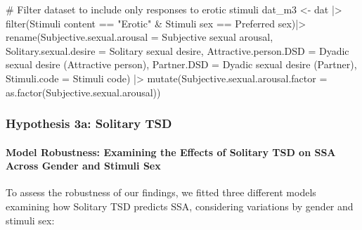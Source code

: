 \documentclass[
  bookmarksnumbered]{article}
\newenvironment{Shaded}{\begin{snugshade}}{\end{snugshade}}
\newcommand{\AttributeTok}[1]{\textcolor[rgb]{0.80,0.80,0.80}{#1}}
\newcommand{\CommentTok}[1]{\textcolor[rgb]{0.50,0.62,0.50}{#1}}
\newcommand{\FunctionTok}[1]{\textcolor[rgb]{0.94,0.94,0.56}{#1}}
\newcommand{\NormalTok}[1]{\textcolor[rgb]{0.80,0.80,0.80}{#1}}
\newcommand{\OtherTok}[1]{\textcolor[rgb]{0.94,0.94,0.56}{#1}}
\newcommand{\SpecialCharTok}[1]{\textcolor[rgb]{0.86,0.64,0.64}{#1}}
\newcommand{\StringTok}[1]{\textcolor[rgb]{0.80,0.58,0.58}{#1}}
\begin{document}
\begin{Shaded}
\begin{Highlighting}[]
\CommentTok{\# Filter dataset to include only responses to erotic stimuli}
\NormalTok{dat\_m3 }\OtherTok{\textless{}{-}}\NormalTok{ dat }\SpecialCharTok{|\textgreater{}}
  \FunctionTok{filter}\NormalTok{(}\StringTok{\textasciigrave{}}\AttributeTok{Stimuli content}\StringTok{\textasciigrave{}} \SpecialCharTok{==} \StringTok{"Erotic"} \SpecialCharTok{\&}
           \StringTok{\textasciigrave{}}\AttributeTok{Stimuli sex}\StringTok{\textasciigrave{}} \SpecialCharTok{==} \StringTok{\textasciigrave{}}\AttributeTok{Preferred sex}\StringTok{\textasciigrave{}}\NormalTok{)}\SpecialCharTok{|\textgreater{}} 
  \FunctionTok{rename}\NormalTok{(}\AttributeTok{Subjective.sexual.arousal =} \StringTok{\textasciigrave{}}\AttributeTok{Subjective sexual arousal}\StringTok{\textasciigrave{}}\NormalTok{,}
         \AttributeTok{Solitary.sexual.desire =} \StringTok{\textasciigrave{}}\AttributeTok{Solitary sexual desire}\StringTok{\textasciigrave{}}\NormalTok{,}
         \AttributeTok{Attractive.person.DSD =} \StringTok{\textasciigrave{}}\AttributeTok{Dyadic sexual desire (Attractive person)}\StringTok{\textasciigrave{}}\NormalTok{,}
         \AttributeTok{Partner.DSD =} \StringTok{\textasciigrave{}}\AttributeTok{Dyadic sexual desire (Partner)}\StringTok{\textasciigrave{}}\NormalTok{,}
         \AttributeTok{Stimuli.code =} \StringTok{\textasciigrave{}}\AttributeTok{Stimuli code}\StringTok{\textasciigrave{}}\NormalTok{) }\SpecialCharTok{|\textgreater{}} 
  \FunctionTok{mutate}\NormalTok{(}\AttributeTok{Subjective.sexual.arousal.factor =} \FunctionTok{as.factor}\NormalTok{(Subjective.sexual.arousal))}
\end{Highlighting}
\end{Shaded}

\subsubsection{Hypothesis 3a: Solitary TSD}\label{hyp3a}

\paragraph{Model Robustness: Examining the Effects of Solitary TSD on SSA Across Gender and Stimuli Sex}\label{model-robustness-examining-the-effects-of-solitary-tsd-on-ssa-across-gender-and-stimuli-sex-1}

To assess the robustness of our findings, we fitted three different models examining how Solitary TSD predicts SSA, considering variations by gender and stimuli sex:
\end{document}
